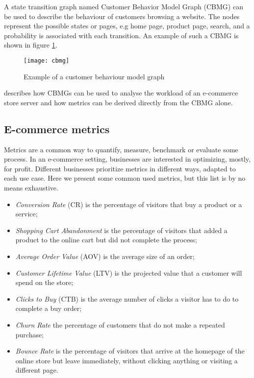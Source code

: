 A state transition graph named Customer Behavior Model Graph (CBMG) can be used 
to describe the behaviour of customers browsing a website. The nodes represent 
the possible states or pages, e.g home page, product page, search, and a 
probability is associated with each transition. An example of such a CBMG is 
shown in figure \ref{fig:cbmg}.

\begin{figure}[h]
    \begin{center}
        \leavevmode
        \texttt{[image: cbmg]}
        \caption{Example of a customer behaviour model graph \cite{Menasce1999}}
        \label{fig:cbmg}
    \end{center}
\end{figure}

\cite{Menasce1999} describes how CBMGs can be used to analyse the workload of 
an e-commerce store server and how metrics can be derived directly from the 
CBMG alone.

\subsection{E-commerce metrics}

Metrics are a common way to quantify, measure, benchmark or evaluate some 
process. In an e-commerce setting, businesses are interested in optimizing, 
mostly, for profit. Different businesses prioritize metrics in different ways, 
adapted to each use case. Here we present some common used metrics, but this 
list is by no means exhaustive. \cite{Sterne2000, Menasce1999}

\begin{itemize}
    \item \textit{Conversion Rate} (CR) is the percentage of visitors that buy 
    a product or a service;
    \item \textit{Shopping Cart Abandonment} is the percentage of visitors that 
    added a product to the online cart but did not complete the process;
    \item \textit{Average Order Value} (AOV) is the average size of an order;
    \item \textit{Customer Lifetime Value} (LTV) is the projected value that a 
    customer will spend on the store;
    \item \textit{Clicks to Buy} (CTB) is the average number of clicks a 
    visitor has to do to complete a buy order;
    \item \textit{Churn Rate} the percentage of customers that do not make a 
    repeated purchase;
    \item \textit{Bounce Rate} is the percentage of visitors that arrive at the 
    homepage of the online store but leave immediately, without clicking 
    anything or visiting a different page.
\end{itemize}

